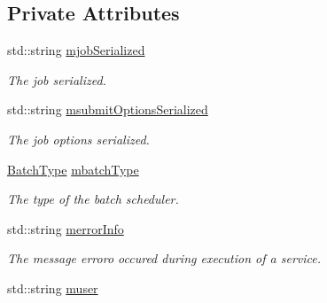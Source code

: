 \subsection*{Private Attributes}
\begin{DoxyCompactItemize}
\item 
\hypertarget{classSSHJobExec_aa39f12bb8b7bf5f64dcdf2ac4b1b7247}{
std::string \hyperlink{classSSHJobExec_aa39f12bb8b7bf5f64dcdf2ac4b1b7247}{mjobSerialized}}
\label{classSSHJobExec_aa39f12bb8b7bf5f64dcdf2ac4b1b7247}

\begin{DoxyCompactList}\small\item\em The job serialized. \item\end{DoxyCompactList}\item 
\hypertarget{classSSHJobExec_ab630639fee39050cc8d1fdcddc4c967e}{
std::string \hyperlink{classSSHJobExec_ab630639fee39050cc8d1fdcddc4c967e}{msubmitOptionsSerialized}}
\label{classSSHJobExec_ab630639fee39050cc8d1fdcddc4c967e}

\begin{DoxyCompactList}\small\item\em The job options serialized. \item\end{DoxyCompactList}\item 
\hypertarget{classSSHJobExec_a8f30e9956ed38ae7745d7faf828f0f14}{
\hyperlink{utilVishnu_8hpp_a864d748e7097d176552dd4c7635016ea}{BatchType} \hyperlink{classSSHJobExec_a8f30e9956ed38ae7745d7faf828f0f14}{mbatchType}}
\label{classSSHJobExec_a8f30e9956ed38ae7745d7faf828f0f14}

\begin{DoxyCompactList}\small\item\em The type of the batch scheduler. \item\end{DoxyCompactList}\item 
\hypertarget{classSSHJobExec_a5ad47645934f0d66a014a91b51e689db}{
std::string \hyperlink{classSSHJobExec_a5ad47645934f0d66a014a91b51e689db}{merrorInfo}}
\label{classSSHJobExec_a5ad47645934f0d66a014a91b51e689db}

\begin{DoxyCompactList}\small\item\em The message erroro occured during execution of a service. \item\end{DoxyCompactList}\item 
\hypertarget{classSSHJobExec_aa9b820ea5e8dbbd83cfa883767f3b50c}{
std::string \hyperlink{classSSHJobExec_aa9b820ea5e8dbbd83cfa883767f3b50c}{muser}}
\label{classSSHJobExec_aa9b820ea5e8dbbd83cfa883767f3b50c}


\end{DoxyCompactItemize}
